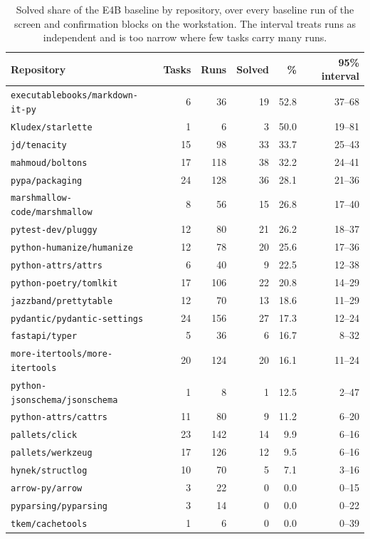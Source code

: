 \begin{table}[p]
\centering
\footnotesize
\caption{Solved share of the E4B baseline by repository, over every baseline run of the screen and confirmation blocks on the workstation. The interval treats runs as independent and is too narrow where few tasks carry many runs.}
\label{tab:repos}
\begin{tabular}{lrrrrr}
\toprule
Repository & Tasks & Runs & Solved & \% & 95\% interval \\
\midrule
\texttt{executablebooks/markdown-it-py} & 6 & 36 & 19 & 52.8 & 37--68 \\
\texttt{Kludex/starlette} & 1 & 6 & 3 & 50.0 & 19--81 \\
\texttt{jd/tenacity} & 15 & 98 & 33 & 33.7 & 25--43 \\
\texttt{mahmoud/boltons} & 17 & 118 & 38 & 32.2 & 24--41 \\
\texttt{pypa/packaging} & 24 & 128 & 36 & 28.1 & 21--36 \\
\texttt{marshmallow-code/marshmallow} & 8 & 56 & 15 & 26.8 & 17--40 \\
\texttt{pytest-dev/pluggy} & 12 & 80 & 21 & 26.2 & 18--37 \\
\texttt{python-humanize/humanize} & 12 & 78 & 20 & 25.6 & 17--36 \\
\texttt{python-attrs/attrs} & 6 & 40 & 9 & 22.5 & 12--38 \\
\texttt{python-poetry/tomlkit} & 17 & 106 & 22 & 20.8 & 14--29 \\
\texttt{jazzband/prettytable} & 12 & 70 & 13 & 18.6 & 11--29 \\
\texttt{pydantic/pydantic-settings} & 24 & 156 & 27 & 17.3 & 12--24 \\
\texttt{fastapi/typer} & 5 & 36 & 6 & 16.7 & 8--32 \\
\texttt{more-itertools/more-itertools} & 20 & 124 & 20 & 16.1 & 11--24 \\
\texttt{python-jsonschema/jsonschema} & 1 & 8 & 1 & 12.5 & 2--47 \\
\texttt{python-attrs/cattrs} & 11 & 80 & 9 & 11.2 & 6--20 \\
\texttt{pallets/click} & 23 & 142 & 14 & 9.9 & 6--16 \\
\texttt{pallets/werkzeug} & 17 & 126 & 12 & 9.5 & 6--16 \\
\texttt{hynek/structlog} & 10 & 70 & 5 & 7.1 & 3--16 \\
\texttt{arrow-py/arrow} & 3 & 22 & 0 & 0.0 & 0--15 \\
\texttt{pyparsing/pyparsing} & 3 & 14 & 0 & 0.0 & 0--22 \\
\texttt{tkem/cachetools} & 1 & 6 & 0 & 0.0 & 0--39 \\
\bottomrule
\end{tabular}
\end{table}
